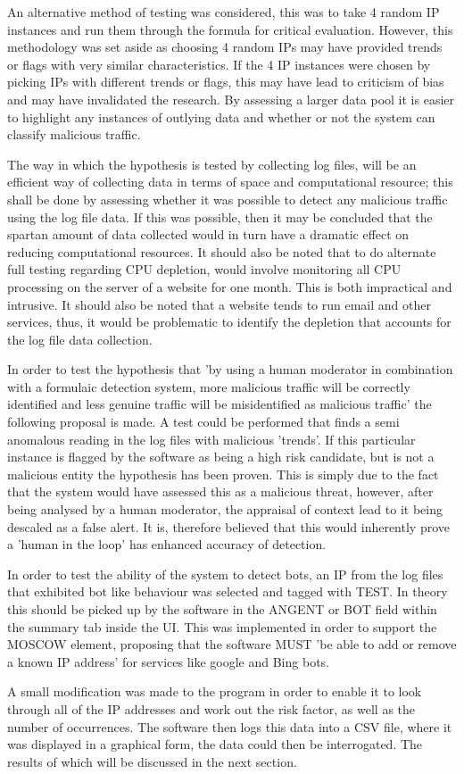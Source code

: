 An alternative method of testing was considered, this was to take 4 random IP instances and run them through the formula for critical evaluation. However, this methodology was set aside as choosing 4 random IPs may have provided trends or flags with very similar characteristics. If the 4 IP instances were chosen by picking IPs with different trends or flags, this may have lead to criticism of bias and may have invalidated the research. By assessing a larger data pool it is easier to highlight any instances of outlying data and whether or not the system can classify malicious traffic.

The way in which the hypothesis is tested by collecting log files, will be an efficient way of collecting data in terms of space and computational resource; this shall be done by assessing whether it was possible to detect any malicious traffic using the log file data. If this was possible, then it may be concluded that the spartan amount of data collected would in turn have a dramatic effect on reducing computational resources. It should also be noted that to do alternate full testing regarding CPU depletion, would involve monitoring all CPU processing on the server of a website for one month. This is both impractical and intrusive. It should also be noted that a website tends to run email and other services, thus, it would be problematic to identify the depletion that accounts for the log file data collection.

In order to test the hypothesis that 'by using a human moderator in combination with a formulaic detection system, more malicious traffic will be correctly identified and less genuine traffic will be misidentified as malicious traffic' the following proposal is made. A test could be performed that finds a semi anomalous reading in the log files with malicious 'trends'. If this particular instance is flagged by the software as being a high risk candidate, but is not a malicious entity the hypothesis has been proven. This is simply due to the fact that the system would have assessed this as a malicious threat, however, after being analysed by a human moderator, the appraisal of context lead to it being descaled as a false alert. It is, therefore believed that this would inherently prove a 'human in the loop' has enhanced accuracy of detection. 

In order to test the ability of the system to detect bots, an IP from the log files that exhibited bot like behaviour was selected and tagged with TEST. In theory this should be picked up by the software in the ANGENT or BOT field within the summary tab inside the UI. This was implemented in order to support the MOSCOW element, proposing that the software MUST 'be able to add or remove a known IP address' for services like google and Bing bots.

A small modification was made to the program in order to enable it to look through all of the IP addresses and work out the risk factor, as well as the number of occurrences. The software then logs this data into a CSV file, where it was displayed in a graphical form, the data could then be interrogated. The results of which will be discussed in the next section.